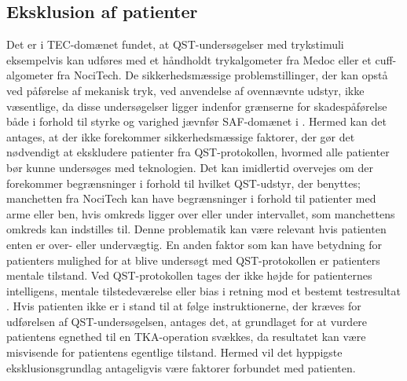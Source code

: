 \subsection{Eksklusion af patienter}
Det er i TEC-domænet fundet, at QST-undersøgelser med trykstimuli eksempelvis kan udføres med et håndholdt trykalgometer fra Medoc eller et cuff-algometer fra NociTech. 
De sikkerhedsmæssige problemstillinger, der kan opstå ved påførelse af mekanisk tryk, ved anvendelse af ovennævnte udstyr, ikke væsentlige, da disse undersøgelser ligger indenfor grænserne for skadespåførelse både i forhold til styrke og varighed jævnfør SAF-domænet i . Hermed kan det antages, at der ikke forekommer sikkerhedsmæssige faktorer, der gør det nødvendigt at ekskludere patienter fra QST-protokollen, hvormed alle patienter bør kunne undersøges med teknologien. Det kan imidlertid overvejes om der forekommer begrænsninger i forhold til hvilket QST-udstyr, der benyttes; manchetten fra NociTech kan have begrænsninger i forhold til patienter med arme eller ben, hvis omkreds ligger over eller under intervallet, som manchettens omkreds kan indstilles til. Denne problematik kan være relevant hvis patienten enten er over- eller undervægtig. En anden faktor som kan have betydning for patienters mulighed for at blive undersøgt med QST-protokollen er patienters mentale tilstand. Ved QST-protokollen tages der ikke højde for patienternes intelligens, mentale tilstedeværelse eller bias i retning mod et bestemt testresultat \citep{Dyck1998}. 
Hvis patienten ikke er i stand til at følge instruktionerne, der kræves for udførelsen af QST-undersøgelsen, antages det, at grundlaget for at vurdere patientens egnethed til en TKA-operation svækkes, da resultatet kan være misvisende for patientens egentlige tilstand. Hermed vil det hyppigste eksklusionsgrundlag antageligvis være faktorer forbundet med patienten.

